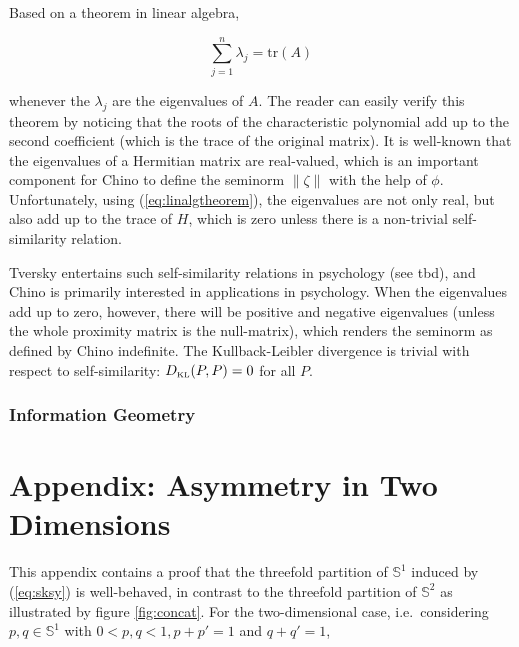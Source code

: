 \documentclass[11pt]{article}
\begin{document}
Based on a theorem in linear algebra,

\begin{equation}
  \label{eq:linalgtheorem}
    \sum_{j=1}^{n}\lambda_{j}=\mbox{tr}(A)
\end{equation}

whenever the $\lambda_{j}$ are the eigenvalues of $A$. The reader can
easily verify this theorem by noticing that the roots of the
characteristic polynomial add up to the second coefficient (which is
the trace of the original matrix). It is well-known that the
eigenvalues of a Hermitian matrix are real-valued, which is an
important component for Chino to define the seminorm $\|\zeta\|$ with
the help of $\phi$. Unfortunately, using (\ref{eq:linalgtheorem}), the
eigenvalues are not only real, but also add up to the trace of $H$,
which is zero unless there is a non-trivial self-similarity relation.

Tversky entertains such self-similarity relations in psychology (see
tbd), and Chino is primarily interested in applications in psychology.
When the eigenvalues add up to zero, however, there will be positive
and negative eigenvalues (unless the whole proximity matrix is the
null-matrix), which renders the seminorm as defined by Chino
indefinite. The Kullback-Leibler divergence is trivial with respect to
self-similarity: $D_{\mbox{\tiny KL}}(P,P)=0$ for all $P$.

\subsubsection{Information Geometry}
\label{subsubsec:infogeo}

\appendix

\section{Appendix: Asymmetry in Two Dimensions}
\label{app:asytwodims}


This appendix contains a proof that the threefold partition of
$\mathbb{S}^{1}$ induced by (\ref{eq:sksy}) is well-behaved, in
contrast to the threefold partition of $\mathbb{S}^{2}$ as illustrated
by figure \ref{fig:concat}. For the two-dimensional case, i.e.\
considering $p,q\in\mathbb{S}^{1}$ with $0<p,q<1, p+p'=1$ and
$q+q'=1$, 

\end{document}
